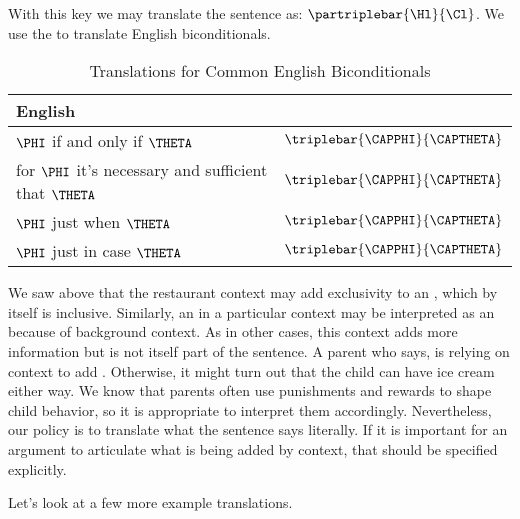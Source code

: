 \noindent{}With this key we may translate the sentence as: $\partriplebar{\Hl}{\Cl}$.  We use the \mention{$\TRIPLEBAR$} to translate English biconditionals.

\begin{table}
	\renewcommand{\arraystretch}{1.5}%
	\begin{center}
		\begin{tabular}{ l l } %
			\toprule
			\textbf{English} & \textbf{\GSL{}} \\ 
			\midrule
			$\PHI$ if and only if $\THETA$ & $\triplebar{\CAPPHI}{\CAPTHETA}$ \\
			for $\PHI$ it's necessary and sufficient that $\THETA$ & $\triplebar{\CAPPHI}{\CAPTHETA}$ \\
			$\PHI$ just when $\THETA$ & $\triplebar{\CAPPHI}{\CAPTHETA}$ \\
			$\PHI$ just in case $\THETA$ & $\triplebar{\CAPPHI}{\CAPTHETA}$ \\
			\bottomrule
		\end{tabular} 
		\caption{Translations for Common English Biconditionals}
		\label{TransTableB}
	\end{center}
\end{table}

We saw above that the restaurant context may add exclusivity to an , which by itself is inclusive.  Similarly, an  in a particular context may be interpreted as an  because of background context.  As in other cases, this context adds more information but is not itself part of the sentence.  A parent who says,  is relying on context to add .  Otherwise, it might turn out that the child can have ice cream either way.  We know that parents often use punishments and rewards to shape child behavior, so it is appropriate to interpret them accordingly.  Nevertheless, our policy is to translate what the sentence says literally. If it is important for an argument to articulate what is being added by context, that should be specified explicitly.

Let's look at a few more example translations.


